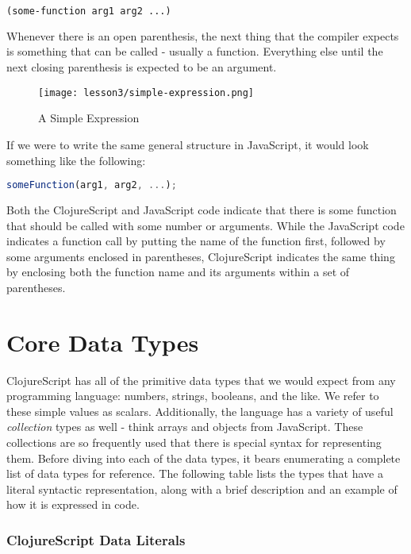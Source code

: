 \documentclass[10pt,twoside,openright]{memoir}
\begin{document}
\begin{lstlisting}[language=Clojure, caption={ClojureScript function expression}]
(some-function arg1 arg2 ...)
\end{lstlisting}

Whenever there is an open parenthesis, the next thing that the compiler
expects is something that can be called - usually a function. Everything
else until the next closing parenthesis is expected to be an argument.

\begin{figure}[H]
\caption{A Simple Expression}
\centering
\texttt{[image: lesson3/simple-expression.png]}
\end{figure}

If we were to write the same general structure in JavaScript, it would
look something like the following:

\begin{lstlisting}[language=JavaScript, caption={JavaScript function expression}]
someFunction(arg1, arg2, ...);
\end{lstlisting}

Both the ClojureScript and JavaScript code indicate that there is some
function that should be called with some number or arguments. While the
JavaScript code indicates a function call by putting the name of the
function first, followed by some arguments enclosed in parentheses,
ClojureScript indicates the same thing by enclosing both the function
name and its arguments within a set of parentheses.

\section{Core Data Types}

ClojureScript has all of the primitive data types that we would expect
from any programming language: numbers, strings, booleans, and the like.
We refer to these simple values as scalars. Additionally, the language
has a variety of useful \emph{collection} types as well - think arrays
and objects from JavaScript. These collections are so frequently used
that there is special syntax for representing them. Before diving into
each of the data types, it bears enumerating a complete list of data
types for reference. The following table lists the types that have a
literal syntactic representation, along with a brief description and an
example of how it is expressed in code.

\subsubsection{ClojureScript Data Literals}
\end{document}
